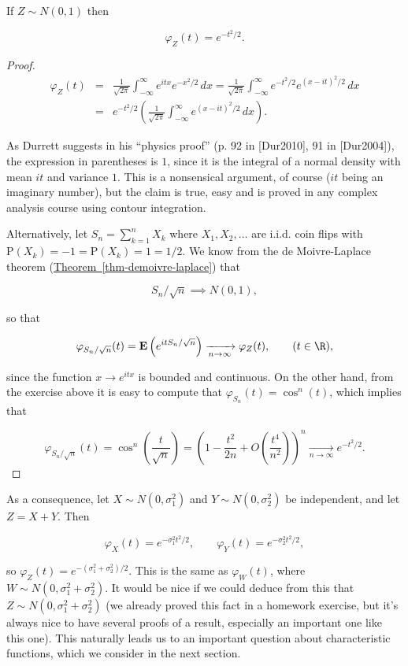\begin{lem}
If $Z\sim N(0,1)$ then

\[
\varphi_Z(t) = e^{-t^2/2}.
\]

\end{lem}

\begin{proof}

\begin{eqnarray*} \varphi_Z(t) &=& \frac{1}{\sqrt{2\pi}}\int_{-\infty}^\infty e^{itx} e^{-x^2/2}\,dx = \frac{1}{\sqrt{2\pi}}
\int_{-\infty}^\infty e^{-t^2/2} e^{(x-it)^2/2}\,dx \\
&=& e^{-t^2/2} \left( \frac{1}{\sqrt{2\pi}}\int_{-\infty}^\infty  e^{(x-it)^2/2}\,dx \right).
\end{eqnarray*}

\noindent As Durrett suggests in his ``physics proof'' (p. 92
in [Dur2010], 91 in [Dur2004]), the expression in
parentheses is $1$, since it is the integral of a
normal density with mean $it$ and variance $1$. This
is a nonsensical argument, of course ($it$ being an
imaginary number), but the claim is true, easy  and is
proved in any complex analysis course using contour
integration.

Alternatively, let $S_n=\sum_{k=1}^n X_k$ where
$X_1,X_2,\ldots$ are i.i.d. coin flips with
$\mathrm{P}(X_k)=-1=\mathrm{P}(X_k)=1=1/2$. We know
from the de Moivre-Laplace theorem (\texorpdfstring{\hyperref[thm-demoivre-laplace]{Theorem~\ref*{thm-demoivre-laplace}}}{Theorem}) that

\[
S_n/\sqrt{n} \implies N(0,1),
\]

\noindent so that

\[
\varphi_{S_n/\sqrt{n}}(t) = \mathbf{E}\left( e^{it S_n/\sqrt{n}} \right) \xrightarrow[n\to\infty]{} \varphi_Z(t),
\qquad (t\in\R),
\]

\noindent since the function $x\to e^{i t x}$ is bounded and
continuous. On the other hand, from the exercise above
it is easy to compute that
$\varphi_{S_n}(t) = \cos^n(t)$, which implies that

\[
\varphi_{S_n/\sqrt{n}}(t) = \cos^n\left(\frac{t}{\sqrt{n}}\right)= \left(1-\frac{t^2}{2n} + O\left(\frac{t^4}{n^2}\right)\right)^n \xrightarrow[n\to\infty]{} e^{-t^2/2}.
\]

\end{proof}

\noindent As a consequence, let $X\sim N(0,\sigma_1^2)$ and
$Y\sim N(0,\sigma_2^2)$ be independent, and let
$Z=X+Y$. Then

\[
\varphi_X(t) = e^{-\sigma_1^2 t^2/2}, \qquad \varphi_Y(t) = e^{-\sigma_2^2 t^2/2},
\]

\noindent so $\varphi_Z(t) = e^{-(\sigma_1^2+\sigma_2^2)/2}$.
This is the same as $\varphi_W(t)$, where
$W\sim N(0,\sigma_1^2+\sigma_2^2)$. It would be nice
if we could deduce from this that
$Z \sim N(0,\sigma_1^2+\sigma_2^2)$ (we already
proved this fact in a homework exercise, but it's
always nice to have several proofs of a result,
especially an important one like this one). This
naturally leads us to an important question about
characteristic functions, which we consider in the
next section.
